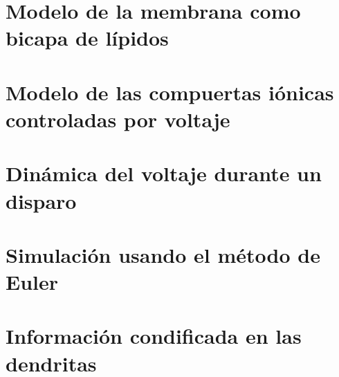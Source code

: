 \section{Modelo de la membrana como bicapa de lípidos}
\section{Modelo de las compuertas iónicas controladas por voltaje}
\section{Dinámica del voltaje durante un disparo} 
\section{Simulación usando el método de Euler}
\section{Información condificada en las dendritas}

